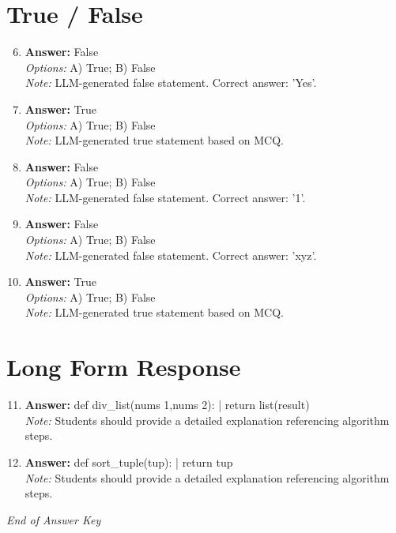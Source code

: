\documentclass[12pt]{article}
\begin{document}
\section*{True / False}
\begin{enumerate}[label=\arabic*.]
\setcounter{enumi}{5}
\item \textbf{Answer:} False
\\ \textit{Options:} A) True; B) False
\\ \textit{Note:} LLM-generated false statement. Correct answer: 'Yes'.
\item \textbf{Answer:} True
\\ \textit{Options:} A) True; B) False
\\ \textit{Note:} LLM-generated true statement based on MCQ.
\item \textbf{Answer:} False
\\ \textit{Options:} A) True; B) False
\\ \textit{Note:} LLM-generated false statement. Correct answer: '1'.
\item \textbf{Answer:} False
\\ \textit{Options:} A) True; B) False
\\ \textit{Note:} LLM-generated false statement. Correct answer: 'xyz'.
\item \textbf{Answer:} True
\\ \textit{Options:} A) True; B) False
\\ \textit{Note:} LLM-generated true statement based on MCQ.
\end{enumerate}

\section*{Long Form Response}
\begin{enumerate}[label=\arabic*.]
\setcounter{enumi}{10}
\item \textbf{Answer:} def div\_list(nums 1,nums 2): | return list(result)
\\ \textit{Note:} Students should provide a detailed explanation referencing algorithm steps.
\item \textbf{Answer:} def sort\_tuple(tup): | return tup
\\ \textit{Note:} Students should provide a detailed explanation referencing algorithm steps.
\end{enumerate}

\vfill
\noindent\textit{End of Answer Key}
\end{document}

